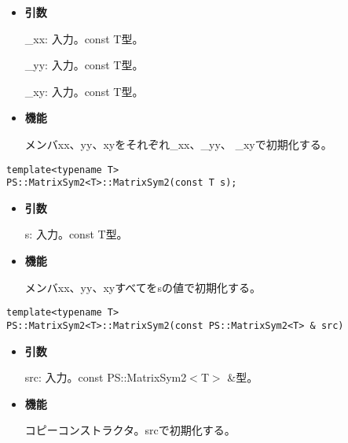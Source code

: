 \begin{itemize}

\item{{\bf 引数}}

{\_xx}: 入力。{const T}型。

{\_yy}: 入力。{const T}型。

{\_xy}: 入力。{const T}型。

\item{{\bf 機能}}

メンバ{xx}、{yy}、{xy}をそれぞれ{\_xx}、{\_yy}、
{\_xy}で初期化する。

\end{itemize}

\begin{screen}
\begin{verbatim}
template<typename T>
PS::MatrixSym2<T>::MatrixSym2(const T s);
\end{verbatim}
\end{screen}

\begin{itemize}

\item{{\bf 引数}}

{s}: 入力。{const T}型。

\item{{\bf 機能}}

メンバ{xx}、{yy}、{xy}すべてを{s}の値で初期化する。

\end{itemize}


\begin{screen}
\begin{verbatim}
template<typename T>
PS::MatrixSym2<T>::MatrixSym2(const PS::MatrixSym2<T> & src)
\end{verbatim}
\end{screen}

\begin{itemize}

\item{{\bf 引数}}

{src}: 入力。{const PS::MatrixSym2$<$T$>$ \&}型。

\item{{\bf 機能}}

コピーコンストラクタ。{src}で初期化する。

\end{itemize}

